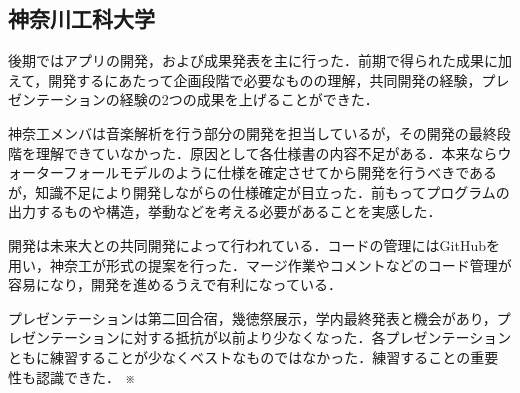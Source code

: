\subsection{神奈川工科大学}
\par 後期ではアプリの開発，および成果発表を主に行った．前期で得られた成果に加えて，開発するにあたって企画段階で必要なものの理解，共同開発の経験，プレゼンテーションの経験の2つの成果を上げることができた．
\par 神奈工メンバは音楽解析を行う部分の開発を担当しているが，その開発の最終段階を理解できていなかった．原因として各仕様書の内容不足がある．本来ならウォーターフォールモデルのように仕様を確定させてから開発を行うべきであるが，知識不足により開発しながらの仕様確定が目立った．前もってプログラムの出力するものや構造，挙動などを考える必要があることを実感した．
\par 開発は未来大との共同開発によって行われている．コードの管理にはGitHubを用い，神奈工が形式の提案を行った．マージ作業やコメントなどのコード管理が容易になり，開発を進めるうえで有利になっている．
\par プレゼンテーションは第二回合宿，幾徳祭展示，学内最終発表と機会があり，プレゼンテーションに対する抵抗が以前より少なくなった．各プレゼンテーションともに練習することが少なくベストなものではなかった．練習することの重要性も認識できた．
※

